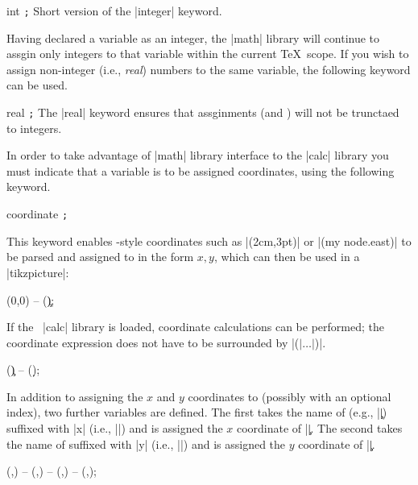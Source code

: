 \begin{math-keyword}{{int} \texttt{;}}
	Short version of the |integer| keyword.
\end{math-keyword}

	Having declared a variable as an integer, the |math| library will 
	continue to assgin only integers to that variable within the 
	current \TeX\ scope. If you wish to assign non-integer (i.e., \emph{real})
	numbers to the same variable, the following keyword can be used.

\begin{math-keyword}{{real} \texttt{;}}
	The |real| keyword ensures that assginments 
	(and ) will not be trunctaed to integers.
\end{math-keyword}
	
	In order to take advantage of |math| library interface to the
	|calc| library	you must indicate that a variable is to be assigned 
	coordinates, using the following keyword.
	
\begin{math-keyword}{{coordinate} 
\texttt{;}}%

	This keyword enables \tikzname-style coordinates such as |(2cm,3pt)| or
	|(my node.east)| to be parsed and
	assigned to  in the form $x,y$, which can then be used
	in a |tikzpicture|:

\begin{codeexample}[]
\tikz\draw (0,0) -- (\c);
\end{codeexample}
	
	If the \tikzname\ |calc| library is loaded,
	coordinate calculations can be performed; 
	the coordinate expression does not have to be
	surrounded by |($|\ldots|$)|.
	
\begin{codeexample}[]
\tikz\draw (\c) -- (\d);
\end{codeexample}
	
	In addition to assigning the $x$ and $y$ coordinates to 
	(possibly with an optional index), two further
	variables are defined. The first takes the name of 
	(e.g., |\c|) suffixed with |x| (i.e., |\cx|) and is assigned the
	$x$ coordinate of |\c|.  
	 The second takes the name of 
		suffixed with |y| (i.e., |\cy|) and is assigned the
		$y$ coordinate of |\c|.  

\begin{codeexample}[]
\tikz\draw (,) -- (,) -- (,) -- (,);
\end{codeexample}
	
\end{math-keyword}

